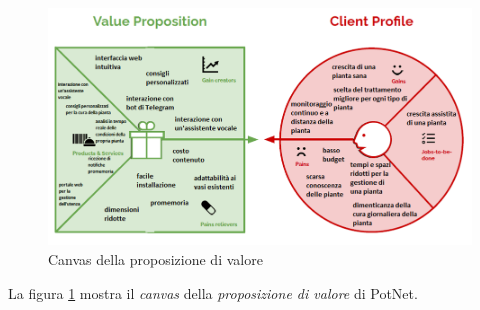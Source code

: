 \begin{figure}[h]
	\centering
	\includegraphics[width=\textwidth]{images/value_proposition.png}
	\caption{Canvas della proposizione di valore}
	\label{fig:value_proposition}
\end{figure}

La figura \ref{fig:value_proposition} mostra il \textit{canvas} della \textit{proposizione di valore} di PotNet.